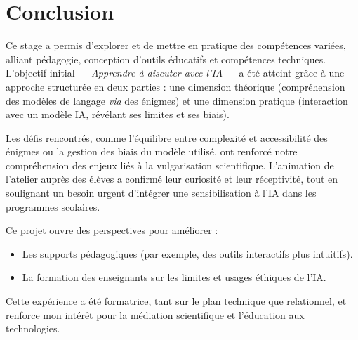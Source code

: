 \section{Conclusion}
Ce stage a permis d'explorer et de mettre en pratique des compétences variées, alliant pédagogie, conception d’outils éducatifs et compétences techniques. L'objectif initial — \textit{Apprendre à discuter avec l'IA} — a été atteint grâce à une approche structurée en deux parties : une dimension théorique (compréhension des modèles de langage \textit{via} des énigmes) et une dimension pratique (interaction avec un modèle IA, révélant ses limites et ses biais).

Les défis rencontrés, comme l'équilibre entre complexité et accessibilité des énigmes ou la gestion des biais du modèle utilisé, ont renforcé notre compréhension des enjeux liés à la vulgarisation scientifique. L'animation de l'atelier auprès des élèves a confirmé leur curiosité et leur réceptivité, tout en soulignant un besoin urgent d'intégrer une sensibilisation à l'IA dans les programmes scolaires.

Ce projet ouvre des perspectives pour améliorer :
\begin{itemize}
    \item Les supports pédagogiques (par exemple, des outils interactifs plus intuitifs).
    \item La formation des enseignants sur les limites et usages éthiques de l'IA.
\end{itemize}

Cette expérience a été formatrice, tant sur le plan technique que relationnel, et renforce mon intérêt pour la médiation scientifique et l'éducation aux technologies.
